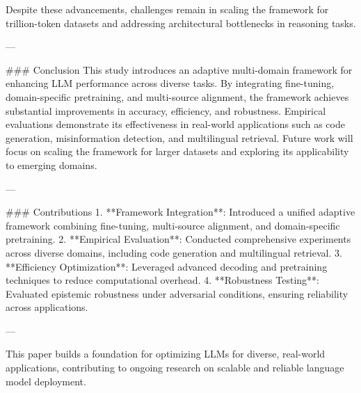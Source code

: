 Despite these advancements, challenges remain in scaling the framework for trillion-token datasets and addressing architectural bottlenecks in reasoning tasks.

---

### Conclusion  
This study introduces an adaptive multi-domain framework for enhancing LLM performance across diverse tasks. By integrating fine-tuning, domain-specific pretraining, and multi-source alignment, the framework achieves substantial improvements in accuracy, efficiency, and robustness. Empirical evaluations demonstrate its effectiveness in real-world applications such as code generation, misinformation detection, and multilingual retrieval. Future work will focus on scaling the framework for larger datasets and exploring its applicability to emerging domains.

---

### Contributions  
1. **Framework Integration**: Introduced a unified adaptive framework combining fine-tuning, multi-source alignment, and domain-specific pretraining.  
2. **Empirical Evaluation**: Conducted comprehensive experiments across diverse domains, including code generation and multilingual retrieval.  
3. **Efficiency Optimization**: Leveraged advanced decoding and pretraining techniques to reduce computational overhead.  
4. **Robustness Testing**: Evaluated epistemic robustness under adversarial conditions, ensuring reliability across applications.

--- 

This paper builds a foundation for optimizing LLMs for diverse, real-world applications, contributing to ongoing research on scalable and reliable language model deployment.